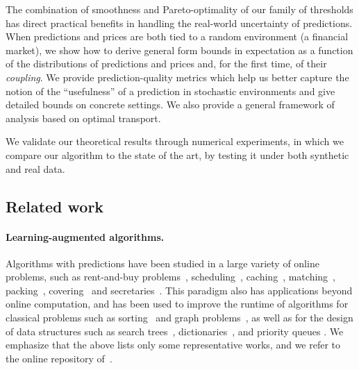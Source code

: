 The combination of smoothness and Pareto-optimality of our family of thresholds has direct practical benefits in handling the real-world uncertainty of predictions. When predictions and prices are both tied to a random environment (\eg a financial market), we show how to derive general form bounds in expectation as a function of the distributions of predictions and prices and, for the first time, of their \emph{coupling}. We provide prediction-quality metrics which help us better capture the notion of the ``usefulness'' of a prediction in stochastic environments and give detailed bounds on concrete settings. We also provide a general framework of analysis based on optimal transport.


We validate our theoretical results through numerical experiments, in which we compare our algorithm to the state of the art, by testing it under both synthetic and real data. 


\subsection{Related work}
\paragraph{Learning-augmented algorithms.}

Algorithms with predictions have been studied in a large variety of online problems, such as rent-and-buy problems~\citep{DBLP:conf/icml/GollapudiP19}, 
scheduling~\citep{lattanzi2020online}, caching~\citep{DBLP:journals/jacm/LykourisV21}, matching~\citep{antoniadis2020secretary}, packing~\citep{im2021online}, covering~\citep{bamas2020primal} and secretaries~\citet{dutting2024secretaries}. This paradigm also has applications beyond online computation, and has been used to improve the runtime of algorithms for classical problems such as sorting~\citep{bai2023sorting} and graph problems~\citep{azar2022online}, as well as for the design of data structures such as search trees~\citep{lin2022learning},  dictionaries~\citep{DBLP:conf/icml/ZeynaliKH24}, and priority queues \citep{benomar2024learning}. We emphasize that the above lists only some representative works, and we refer to the online repository of~\citet{predictionslist}.


